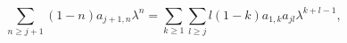 \begin{equation}
\sum_{n\geq j+1}(1-n)a_{j+1, n}\lambda^{n}=\sum_{k\geq 1}\sum_{l\geq j}l(1-k) a_{1,k}a_{jl}\lambda^{k+l-1},\label{a.19}
\end{equation}

